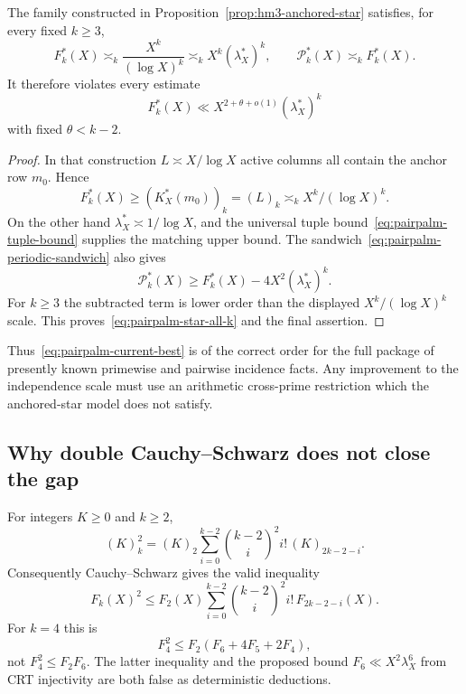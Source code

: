 \begin{proposition}
\label{prop:pairpalm-star-all-k}
The family constructed in Proposition~\ref{prop:hm3-anchored-star}
satisfies, for every fixed $k\geq3$,
\begin{equation}\label{eq:pairpalm-star-all-k}
 F_k^*(X)\asymp_k\frac{X^k}{(\log X)^k}
 \asymp_k X^k(\lambda_X^*)^k,
 \qquad
 \mathscr P_k^*(X)\asymp_k F_k^*(X).
\end{equation}
It therefore violates every estimate
\[
 F_k^*(X)\ll X^{2+\theta+o(1)}(\lambda_X^*)^k
\]
with fixed $\theta<k-2$.
\end{proposition}

\begin{proof}
In that construction $L\asymp X/\log X$ active columns all contain the
anchor row $m_0$.  Hence
\[
 F_k^*(X)\geq(K_X^*(m_0))_k=(L)_k
 \asymp_k X^k/(\log X)^k.
\]
On the other hand $\lambda_X^*\asymp1/\log X$, and the universal tuple
bound~\eqref{eq:pairpalm-tuple-bound} supplies the matching upper bound.
The sandwich~\eqref{eq:pairpalm-periodic-sandwich} also gives
\[
 \mathscr P_k^*(X)
 \geq F_k^*(X)-4X^2(\lambda_X^*)^k.
\]
For $k\geq3$ the subtracted term is lower order than the displayed
$X^k/(\log X)^k$ scale.  This proves~\eqref{eq:pairpalm-star-all-k} and
the final assertion.
\end{proof}

Thus~\eqref{eq:pairpalm-current-best} is of the correct order for the
full package of presently known primewise and pairwise incidence facts.
Any improvement to the independence scale must use an arithmetic
cross-prime restriction which the anchored-star model does not satisfy.

\subsection*{Why double Cauchy--Schwarz does not close the gap}

\begin{proposition}
\label{prop:pairpalm-CS-audit}
For integers $K\geq0$ and $k\geq2$,
\begin{equation}\label{eq:pairpalm-overlap-identity}
 (K)_k^2
 =(K)_2\sum_{i=0}^{k-2}\binom{k-2}{i}^2i!\,
       (K)_{2k-2-i}.
\end{equation}
Consequently Cauchy--Schwarz gives the valid inequality
\begin{equation}\label{eq:pairpalm-correct-CS}
 F_k(X)^2
 \leq F_2(X)
 \sum_{i=0}^{k-2}\binom{k-2}{i}^2i!\,
       F_{2k-2-i}(X).
\end{equation}
For $k=4$ this is
\begin{equation}\label{eq:pairpalm-correct-CS4}
 F_4^2\leq F_2(F_6+4F_5+2F_4),
\end{equation}
not $F_4^2\leq F_2F_6$.
The latter inequality and the proposed bound
$F_6\ll X^2\lambda_X^6$ from CRT injectivity are both false as
deterministic deductions.
\end{proposition}

